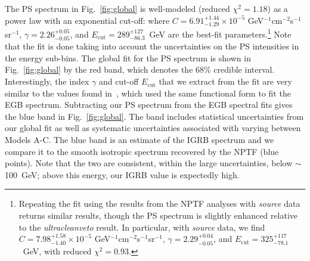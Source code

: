 The PS spectrum in Fig.~\ref{fig:global} is well-modeled (reduced \mbox{$\chi^2 = 1.18$}) as a power law with an exponential cut-off:
where $C=6.91_{-1.29}^{+1.44} \times 10^{-5}$ GeV$^{-1}$cm$^{-2}$s$^{-1}$sr$^{-1}$,  $\gamma= 2.26_{-0.05}^{+0.05}$, and $E_\text{cut} = 289_{-86.3}^{+127}$~GeV are the best-fit parameters.\footnote{Repeating the fit using the results from the NPTF analyses with {\it source} data returns similar results, though the PS spectrum is slightly enhanced relative to the {\it ultracleanveto} result.  In particular, with {\it source} data, we find $C=7.98_{-1.40}^{+1.58} \times 10^{-5}$ GeV$^{-1}$cm$^{-2}$s$^{-1}$sr$^{-1}$,  $\gamma= 2.29_{-0.05}^{+0.04}$, and $E_\text{cut} = 325_{-78.1}^{+117}$~GeV, with reduced $\chi^2 = 0.93$. }  Note that the fit is done taking into account the uncertainties on the PS intensities in the energy sub-bins.  The global fit for the PS spectrum is shown in Fig.~\ref{fig:global} by the red band, which denotes the 68\% credible interval.  Interestingly, the index $\gamma$ and cut-off $E_\text{cut}$ that we extract from the fit are very similar to the values found in~\cite{Ackermann:2014usa}, which used the same functional form to fit the EGB spectrum.  Subtracting our PS spectrum from the EGB spectral fits gives the blue band in Fig.~\ref{fig:global}.  The band includes statistical uncertainties from our global fit as well as systematic uncertainties associated with varying between Models A-C.  The blue band is an estimate of the IGRB spectrum and we compare it to the smooth isotropic spectrum recovered by the NPTF (blue points).  Note that the two are consistent, within the large uncertainties, below $\sim$100~GeV; above this energy, our IGRB value is expectedly high. 

